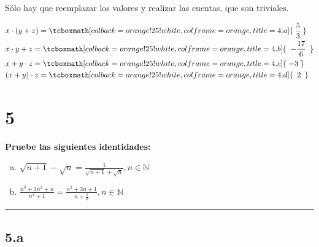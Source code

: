 \documentclass{article}
\begin{document}
\vspace{1em}

Sólo hay que reemplazar los valores y realizar las cuentas, que son triviales.

\begin{subequations}
\begin{align}
& x \cdot (y + z) = \tcboxmath[colback=orange!25!white,colframe=orange, title=4.a] { \hspace{0.25em} \frac{5}{3} \hspace{0.25em} } \\
& x \cdot y + z = \tcboxmath[colback=orange!25!white,colframe=orange, title=4.b] { \hspace{0.5em} -\frac{17}{6} \hspace{0.5em} } \\
& x + y \cdot z = \tcboxmath[colback=orange!25!white,colframe=orange, title=4.c] { \hspace{0.25em} -3 \hspace{0.25em} } \\
& (x + y) \cdot z = \tcboxmath[colback=orange!25!white,colframe=orange, title=4.d] { \hspace{0.5em} 2 \hspace{0.5em} }
\end{align}
\end{subequations}

\section*{5}
\label{sec:5}

\textbf{Pruebe las siguientes identidades:}

\begin{enumerate}[(a)]
\bfseries

\item $ \sqrt{n+1} - \sqrt{n} = \frac{1}{\sqrt{n+1} + \sqrt{n}}, n \in \mathbb{N} $

\item $ \frac{n^3 + 3n^2 + n}{n^2 + 1} = \frac{n^2 + 3n + 1}{n + \frac{1}{n}}, n \in \mathbb{N}$

\end{enumerate}
\hrule

\subsection*{5.a}
\label{subsec:5.a}
\end{document}
